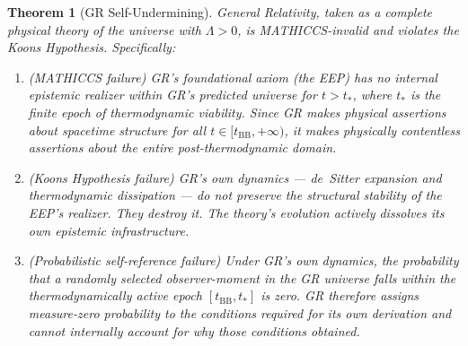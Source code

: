 \documentclass[11pt,a4paper]{article}
\newtheorem{theorem}{Theorem}
\begin{document}
\begin{theorem}[GR Self-Undermining]
\label{thm:main}
General Relativity, taken as a complete physical theory of the universe with
$\Lambda > 0$, is MATHICCS-invalid and violates the Koons Hypothesis. Specifically:

\begin{enumerate}[label=(\roman*)]
\item \textup{(MATHICCS failure)} GR's foundational axiom (the EEP) has no internal
      epistemic realizer within GR's predicted universe for $t > t_*$, where $t_*$ is
      the finite epoch of thermodynamic viability. Since GR makes physical assertions
      about spacetime structure for all $t \in [t_{\mathrm{BB}}, +\infty)$, it makes
      physically contentless assertions about the entire post-thermodynamic domain.

\item \textup{(Koons Hypothesis failure)} GR's own dynamics --- de~Sitter expansion
      and thermodynamic dissipation --- do not preserve the structural stability of the
      EEP's realizer. They destroy it. The theory's evolution actively dissolves its
      own epistemic infrastructure.

\item \textup{(Probabilistic self-reference failure)} Under GR's own dynamics, the
      probability that a randomly selected observer-moment in the GR universe falls
      within the thermodynamically active epoch $[t_{\mathrm{BB}}, t_*]$ is zero.
      GR therefore assigns measure-zero probability to the conditions required for its
      own derivation and cannot internally account for why those conditions obtained.
\end{enumerate}
\end{theorem}
\end{document}
